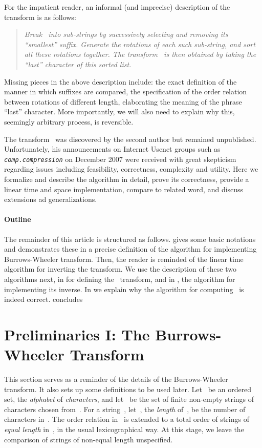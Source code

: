 \documentclass[a4paper,12pt]{article}
\newcommand{\str}[1]{{\textit{\texttt{#1}}}}
\numberwithin{algorithm}{section}
\begin{document}
For the impatient reader, an informal (and imprecise) description of the~ transform
  is as follows:
\begin{quote}
\sl Break~ into sub-strings by successively selecting and removing its “smallest'' suffix.
         Generate the rotations of each such sub-string, and sort all these rotations together.
        The transform~ is then obtained by taking the “last'' character of this sorted list.
\end{quote}
Missing pieces in the above description include: the exact definition of the manner in which suffixes
  are compared, the specification of the order relation between rotations of different length,
  elaborating the meaning of the phrase “last'' character.
More importantly, we will also need to explain why this, seemingly arbitrary process,
  is reversible.

The transform~ was discovered by the second author but remained unpublished.
Unfortunately, his announcements on Internet Usenet
  groups such as \str{comp.compression} on December 2007
  were received with great skepticism regarding issues including feasibility, correctness,
  complexity and utility.
Here we formalize and describe the algorithm in detail, prove its correctness,
  provide a linear time and space implementation, compare to related word,
  and discuss extensions ad generalizations.

\paragraph{Outline} The remainder of this article is structured as follows.
gives some basic notations and demonstrates these in a precise
  definition of the algorithm for implementing Burrows-Wheeler transform.
Then, the reader is reminded of the
  linear time algorithm for inverting the transform.
We use the description of these two algorithms next,  in  for defining the~ transform,
  and in ,  the algorithm for
  implementing its inverse.
In  we explain why the algorithm for computing~
  is indeed correct.
 concludes



\section{Preliminaries I: The Burrows-Wheeler Transform}
\label{Section:BWT}
This section serves as a reminder of the details of the Burrows-Wheeler
  transform.
It also sets up some definitions to be used later.
Let~ be an ordered set, the \emph{alphabet} of \emph{characters},
  and let~ be the set
  of finite non-empty strings of characters chosen from~.
For a  string~, let~, the \emph{length} of~,
  be the number of characters in~.
The order relation in~ is extended to a total order of
  strings of \emph{equal length} in~,
  in the usual lexicographical way.
At this stage, we leave the comparison of strings of non-equal length
  unspecified.
\end{document}
